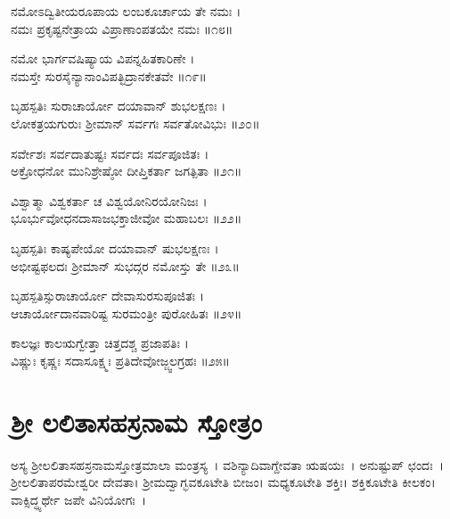 ನಮೋಽದ್ವಿತೀಯರೂಪಾಯ ಲಂಬಕೂರ್ಚಾಯ ತೇ ನಮಃ ।\\
ನಮಃ ಪ್ರಕೃಷ್ಟನೇತ್ರಾಯ ವಿಪ್ರಾಣಾಂಪತಯೇ ನಮಃ ॥೧೮॥

ನಮೋ ಭಾರ್ಗವಷಿಷ್ಯಾಯ ವಿಪನ್ನಹಿತಕಾರಿಣೇ ।\\
ನಮಸ್ತೇ ಸುರಸೈನ್ಯಾನಾಂವಿಪತ್ಛಿದ್ರಾನಕೇತವೇ ॥೧೯॥

ಬೃಹಸ್ಪತಿಃ ಸುರಾಚಾರ್ಯೋ ದಯಾವಾನ್ ಶುಭಲಕ್ಷಣಃ ।\\
ಲೋಕತ್ರಯಗುರುಃ ಶ್ರೀಮಾನ್ ಸರ್ವಗಃ ಸರ್ವತೋವಿಭುಃ ॥೨೦॥

ಸರ್ವೇಶಃ ಸರ್ವದಾತುಷ್ಟಃ ಸರ್ವದಃ ಸರ್ವಪೂಜಿತಃ ।\\
ಅಕ್ರೋಧನೋ ಮುನಿಶ್ರೇಷ್ಠೋ ದೀಪ್ತಿಕರ್ತಾ ಜಗತ್ಪಿತಾ ॥೨೧॥

ವಿಶ್ವಾತ್ಮಾ ವಿಶ್ವಕರ್ತಾ ಚ ವಿಶ್ವಯೋನಿರಯೋನಿಜಃ ।\\
ಭೂರ್ಭುವೋಧನದಾಸಾಜಭಕ್ತಾಜೀವೋ ಮಹಾಬಲಃ ॥೨೨॥

ಬೃಹಸ್ಪತಿಃ ಕಾಷ್ಯಪೇಯೋ ದಯಾವಾನ್ ಷುಭಲಕ್ಷಣಃ ।\\
ಅಭೀಷ್ಟಫಲದಃ ಶ್ರೀಮಾನ್ ಸುಭದ್ಗರ ನಮೋಸ್ತು ತೇ ॥೨೩॥

ಬೃಹಸ್ಪತಿಸ್ಸುರಾಚಾರ್ಯೋ ದೇವಾಸುರಸುಪೂಜಿತಃ ।\\
ಆಚಾರ್ಯೋದಾನವಾರಿಷ್ಟ ಸುರಮಂತ್ರೀ ಪುರೋಹಿತಃ ॥೨೪॥

ಕಾಲಜ್ಞಃ ಕಾಲಋಗ್ವೇತ್ತಾ ಚಿತ್ತದಶ್ಚ ಪ್ರಜಾಪತಿಃ ।\\
ವಿಷ್ಣುಃ ಕೃಷ್ಣಃ ಸದಾಸೂಕ್ಷ್ಮಃ ಪ್ರತಿದೇವೋಜ್ಜ್ವಲಗ್ರಹಃ ॥೨೫॥

\section{ ಶ್ರೀ ಲಲಿತಾಸಹಸ್ರನಾಮ ಸ್ತೋತ್ರಂ }
ಅಸ್ಯ ಶ್ರೀಲಲಿತಾಸಹಸ್ರನಾಮಸ್ತೋತ್ರಮಾಲಾ ಮಂತ್ರಸ್ಯ~। ವಶಿನ್ಯಾದಿವಾಗ್ದೇವತಾ ಋಷಯಃ~। ಅನುಷ್ಟುಪ್ ಛಂದಃ~। ಶ್ರೀಲಲಿತಾಪರಮೇಶ್ವರೀ ದೇವತಾ। ಶ್ರೀಮದ್ವಾಗ್ಭವಕೂಟೇತಿ ಬೀಜಂ। ಮಧ್ಯಕೂಟೇತಿ ಶಕ್ತಿಃ। ಶಕ್ತಿಕೂಟೇತಿ ಕೀಲಕಂ। ವಾಕ್ಸಿದ್ಧ್ಯರ್ಥೇ ಜಪೇ ವಿನಿಯೋಗಃ~।\\


